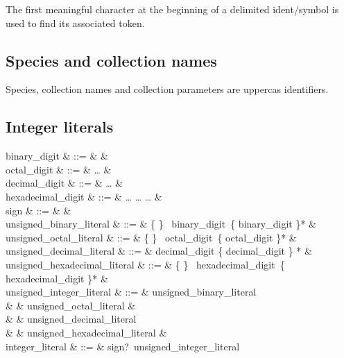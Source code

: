 The first meaningful character at the beginning of a delimited
ident/symbol is used to find its associated token.

\subsection{Species and collection names}
 Species, collection
names and collection parameters are uppercas identifiers.

\subsection{Integer literals}
\label{integer literals}
\label{octal}
\label{hexadecimal}
\label{binary}

\begin{syntax}
binary\_digit & ::= &  \mid {} & \\
octal\_digit & ::= &  \ldots {} & \\
decimal\_digit & ::= &  \ldots {} & \\
hexadecimal\_digit & ::= &  \ldots {}
       \mid {} \ldots {}
       \mid {} \ldots {} & \\
sign & ::= & \terminal{+} \mid \terminal{-} & \\
unsigned\_binary\_literal & ::= &
   \{  \mid {} \}
  \ binary\_digit\ \{ binary\_digit \mid \terminal{\_} \}* & \\
unsigned\_octal\_literal & ::= &
   \{  \mid {} \}
  \ octal\_digit\ \{ octal\_digit \mid \terminal{\_} \}* & \\
unsigned\_decimal\_literal & ::= &
  decimal\_digit \{ decimal\_digit \mid \terminal{\_} \} * & \\
unsigned\_hexadecimal\_literal & ::= &
   \{  \mid {} \}
  \ hexadecimal\_digit\ \{ hexadecimal\_digit \mid \terminal{\_} \}* & \\
unsigned\_integer\_literal & ::= & unsigned\_binary\_literal \\
& & \mid unsigned\_octal\_literal & \\
& & \mid unsigned\_decimal\_literal \\
& & \mid unsigned\_hexadecimal\_literal & \\
integer\_literal & ::= & sign?\ unsigned\_integer\_literal
\end{syntax}

